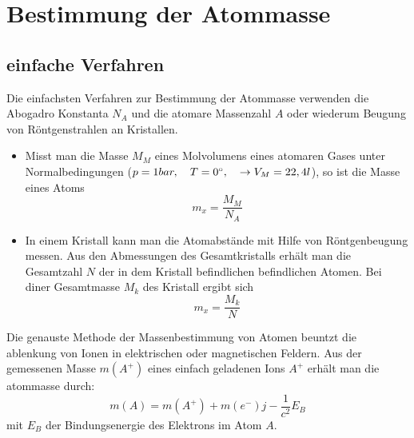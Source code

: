 \section{Bestimmung der Atommasse} %
\label{sec:Bestimmung_der_Atommasse}
\subsection{einfache Verfahren} %
\label{sub:einfache_Verfahren}
Die einfachsten Verfahren zur Bestimmung der Atommasse verwenden die Abogadro
Konstanta $N_A$ und die atomare Massenzahl $A$ oder wiederum Beugung von
Röntgenstrahlen an Kristallen.
\begin{itemize}
    \item Misst man die Masse $M_M$ eines Molvolumens eines atomaren Gases
    unter Normalbedingungen ($p=1bar, \quad T=0^{\circ}, \quad \rightarrow V_M =
    22,4l$), so ist die Masse eines Atoms
    \begin{equation*}
        m_x = \frac{M_M}{N_A}
    \end{equation*}
    \item In einem Kristall kann man die Atomabstände mit Hilfe von
    Röntgenbeugung messen. Aus den Abmessungen des Gesamtkristalls erhält man
    die Gesamtzahl $N$ der in dem Kristall befindlichen befindlichen Atomen.
    Bei diner Gesamtmasse $M_k$ des Kristall ergibt sich
    \begin{equation*}
        m_x = \frac{M_k}{N}
    \end{equation*}
\end{itemize}
Die genauste Methode der Massenbestimmung von Atomen beuntzt die ablenkung von
Ionen in elektrischen oder magnetischen Feldern.
Aus der gemessenen Masse $m(A^+)$ eines einfach geladenen Ions $A^+$ erhält man
die atommasse durch:
\begin{equation*}
    m(A) = m(A^+) + m(e^-) j- \frac{1}{c^2}E_B
\end{equation*}
mit $E_B$ der Bindungsenergie des Elektrons im Atom $A$.


